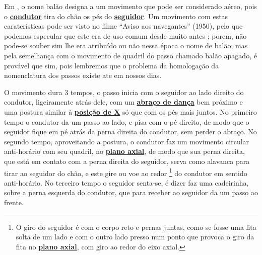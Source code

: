 Em \AnoLivro, o nome balão designa a um movimento que pode ser considerado aéreo, 
pois o \hyperref[def:Condutor]{\textbf{condutor}} tira do chão os pés do \hyperref[def:Seguidor]{\textbf{seguidor}}.
Um movimento com estas caraterísticas pode ser visto no filme ``Aviso aos navegantes'' (1950),
pelo que podemos especular que este era de uso comum desde muito antes \cite[min. 40:35]{AtlantidaDance};
porem, não pode-se souber sim lhe era atribuído ou não nessa época o nome de balão; 
mas pela semelhança com o movimento de quadril do passo chamado balão apagado,
é provável que sim, 
pois lembremos que o problema da homologação da nomenclatura dos passos existe ate em  nossos dias.



O movimento dura 3 tempos, o passo inicia com o seguidor ao lado direito do condutor, 
ligeiramente atrás dele, com um \hyperref[def:abracodedanca]{\textbf{abraço de dança}} 
bem próximo e uma postura similar à \hyperref[def:X-position]{\textbf{posição de X}} só que com os pés mais juntos.
No primeiro tempo o condutor da um passo ao lado, e pisa com o pé direito,
de modo que o seguidor fique em pé atrás da perna direita do condutor, sem perder o abraço.
No segundo tempo, aproveitando a postura, 
o condutor faz um movimento circular anti-horário com seu quadril, no \hyperref[def:PlanoAxial]{\textbf{plano axial}},
de modo que sua perna direita, que está em contato com a perna direita do seguidor,
serva como alavanca para tirar ao seguidor do chão, 
e este gire ou voe ao redor \footnote{O giro do seguidor é com o corpo reto e pernas juntas, 
como se fosse uma fita solta de um lado e com o outro lado presso num ponto 
que provoca o giro da fita no \hyperref[def:PlanoAxial]{\textbf{plano axial}}, com giro ao redor do eixo axial.} 
do condutor em sentido anti-horário.
No terceiro tempo o seguidor senta-se, é dizer faz uma cadeirinha, sobre a perna esquerda do condutor,
que para receber ao seguidor  da um passo ao frente.

